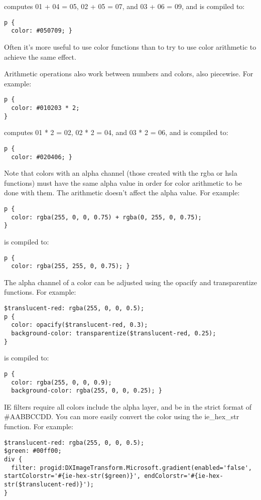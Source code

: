 \documentclass[9pt]{article}
\begin{document}
 computes 01 + 04 = 05, 02 + 05 = 07, and 03 + 06 = 09, and is compiled to:
\begin{verbatim}
p {
  color: #050709; }
\end{verbatim}


 Often it’s more useful to use color functions than to try to use color arithmetic to achieve the same effect.


 Arithmetic operations also work between numbers and colors, also piecewise. For example:
\begin{verbatim}
p {
  color: #010203 * 2;
}
\end{verbatim}


 computes 01 * 2 = 02, 02 * 2 = 04, and 03 * 2 = 06, and is compiled to:
\begin{verbatim}
p {
  color: #020406; }
\end{verbatim}


 Note that colors with an alpha channel (those created with the rgba or hsla functions) must have the same alpha value in order for color arithmetic to be done with them. The arithmetic doesn’t affect the alpha value. For example:
\begin{verbatim}
p {
  color: rgba(255, 0, 0, 0.75) + rgba(0, 255, 0, 0.75);
}
\end{verbatim}


 is compiled to:
\begin{verbatim}
p {
  color: rgba(255, 255, 0, 0.75); }
\end{verbatim}


 The alpha channel of a color can be adjusted using the opacify and transparentize functions. For example:
\begin{verbatim}
$translucent-red: rgba(255, 0, 0, 0.5);
p {
  color: opacify($translucent-red, 0.3);
  background-color: transparentize($translucent-red, 0.25);
}
\end{verbatim}


 is compiled to:
\begin{verbatim}
p {
  color: rgba(255, 0, 0, 0.9);
  background-color: rgba(255, 0, 0, 0.25); }
\end{verbatim}


 IE filters require all colors include the alpha layer, and be in the strict format of \#AABBCCDD. You can more easily convert the color using the ie\_hex\_str function. For example:
\begin{verbatim}
$translucent-red: rgba(255, 0, 0, 0.5);
$green: #00ff00;
div {
  filter: progid:DXImageTransform.Microsoft.gradient(enabled='false', startColorstr='#{ie-hex-str($green)}', endColorstr='#{ie-hex-str($translucent-red)}');
}
\end{verbatim}
\end{document}
